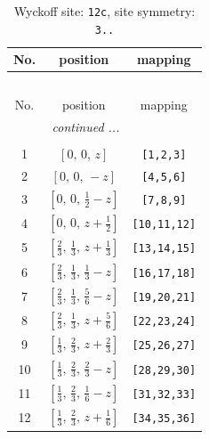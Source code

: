 \documentclass[fleqn,8pt]{jsarticle}
\begin{document}
\begin{longtable}{ccc}
\caption{Wyckoff site: {\tt 12c}, site symmetry: {\tt 3..}}
 \\
 \hline \hline
No. & position & mapping \\ \hline \endfirsthead

\multicolumn{2}{l}{\tablename\ \thetable{}} \\
 \hline \hline
No. & position & mapping \\ \hline \endhead

 \hline \hline
\multicolumn{2}{r}{\footnotesize\it continued ...} \\ \endfoot

 \hline \hline
\multicolumn{2}{r}{} \\ \endlastfoot

1 & $\left[ 0,\, 0,\, z \right]$ & {\tt [1,2,3]} \\ \hline
2 & $\left[ 0,\, 0,\, - z \right]$ & {\tt [4,5,6]} \\ \hline
3 & $\left[ 0,\, 0,\, \frac{1}{2} - z \right]$ & {\tt [7,8,9]} \\ \hline
4 & $\left[ 0,\, 0,\, z + \frac{1}{2} \right]$ & {\tt [10,11,12]} \\ \hline
5 & $\left[ \frac{2}{3},\, \frac{1}{3},\, z + \frac{1}{3} \right]$ & {\tt [13,14,15]} \\ \hline
6 & $\left[ \frac{2}{3},\, \frac{1}{3},\, \frac{1}{3} - z \right]$ & {\tt [16,17,18]} \\ \hline
7 & $\left[ \frac{2}{3},\, \frac{1}{3},\, \frac{5}{6} - z \right]$ & {\tt [19,20,21]} \\ \hline
8 & $\left[ \frac{2}{3},\, \frac{1}{3},\, z + \frac{5}{6} \right]$ & {\tt [22,23,24]} \\ \hline
9 & $\left[ \frac{1}{3},\, \frac{2}{3},\, z + \frac{2}{3} \right]$ & {\tt [25,26,27]} \\ \hline
10 & $\left[ \frac{1}{3},\, \frac{2}{3},\, \frac{2}{3} - z \right]$ & {\tt [28,29,30]} \\ \hline
11 & $\left[ \frac{1}{3},\, \frac{2}{3},\, \frac{1}{6} - z \right]$ & {\tt [31,32,33]} \\ \hline
12 & $\left[ \frac{1}{3},\, \frac{2}{3},\, z + \frac{1}{6} \right]$ & {\tt [34,35,36]} \\
\end{longtable}
\renewcommand{\arraystretch}{1.2}
\end{document}
